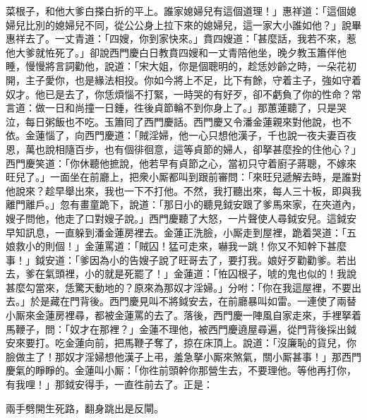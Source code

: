 菜根子，{}和他大爹白搽白折的平上。誰家媳婦兒有這個道理！」惠祥道：「這個媳婦兒比別的媳婦兒不同，從公公身上拉下來的媳婦兒，{}這一家大小誰如他？」說畢惠祥去了。一丈青道：「四嫂，你到家快來。」賁四嫂道：「甚麼話，我若不來，惹他大爹就恠死了。」卻說西門慶白日教賁四嫂和一丈青陪他坐，晚夕教玉簫伴他睡，慢慢將言詞勸他，說道：「宋大姐，你是個聰明的，趁恁妙齡之時，一朵花初開，主子愛你，也是緣法相投。你如今將上不足，比下有餘，守着主子，強如守着奴才。他已是去了，你恁煩惱不打緊，一時哭的有好歹，卻不虧負了你的性命？常言道：做一日和尚撞一日鍾，徃後貞節輪不到你身上了。」{}那蕙蓮聽了，只是哭泣，每日粥飯也不吃。{}玉簫囘了西門慶話。西門慶又令潘金蓮親來對他說，也不依。金蓮惱了，向西門慶道：「賊淫婦，他一心只想他漢子，千也說一夜夫妻百夜恩，萬也說相隨百步，也有個徘徊意，這等貞節的婦人，卻拏甚麼拴的住他心？」西門慶笑道：「你休聽他摭說，他若早有貞節之心，當初只守着廚子蔣聰，不嫁來旺兒了。」{}一面坐在前廳上，把衆小厮都叫到跟前審問：「來旺兒遞解去時，是誰對他說來？趁早舉出來，我也一下不打他。不然，我打聽出來，每人三十板，即與我離門離戶。」忽有畫童跪下，說道：「那日小的聽見鉞安跟了爹馬來家，在夾道內，嫂子問他，他走了口對嫂子說。」西門慶聽了大怒，一片聲使人尋鉞安兒。這鉞安早知訊息，一直躲到潘金蓮房裡去。金蓮正洗臉，小厮走到屋裡，跪着哭道：「五娘救小的則個！」金蓮罵道：「賊囚！猛可走來，嚇我一跳！你又不知幹下甚麼事！」鉞安道：「爹因為小的告嫂子說了旺哥去了，要打我。娘好歹勸勸爹。若出去，爹在氣頭裡，小的就是死罷了！」金蓮道：「恠囚根子，唬的鬼也似的！我說甚麼勾當來，恁驚天動地的？原來為那奴才淫婦。」分咐：「你在我這屋裡，不要出去。」於是藏在門背後。西門慶見叫不將鉞安去，在前廳暴叫如雷。一連使了兩替小厮來金蓮房裡尋，都被金蓮罵的去了。落後，西門慶一陣風自家走來，手裡拏着馬鞭子，問：「奴才在那裡？」金蓮不理他，被西門慶遶屋尋遍，從門背後採出鉞安來要打。吃金蓮向前，把馬鞭子奪了，掠在床頂上。{}說道：「沒廉恥的貨兒，你臉做主了！那奴才淫婦想他漢子上弔，羞急拏小厮來煞氣，關小厮甚事！」那西門慶氣的睜睜的。{}金蓮叫小厮：「你徃前頭幹你那營生去，不要理他。等他再打你，有我哩！」那鉞安得手，一直徃前去了。正是：

兩手劈開生死路，翻身跳出是反閘。

